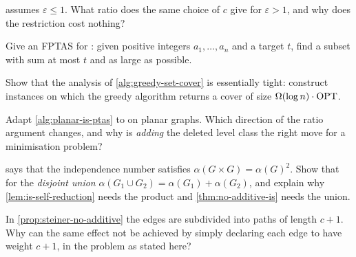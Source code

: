 \begin{exercise}
 assumes $\varepsilon \le 1$. What ratio does the same
choice of $c$ give for $\varepsilon > 1$, and why does the restriction cost
nothing?
\end{exercise}

\begin{exercise}
Give an FPTAS for : given positive integers $a_1,\dots,a_n$ and
a target $t$, find a subset with sum at most $t$ and as large as possible.
\end{exercise}

\begin{exercise}
Show that the analysis of \cref{alg:greedy-set-cover} is essentially tight:
construct instances on which the greedy algorithm returns a cover of size
$\Omega(\log n) \cdot \mathrm{OPT}$.
\end{exercise}

\begin{exercise}
Adapt \cref{alg:planar-is-ptas} to  on planar graphs. Which
direction of the ratio argument changes, and why is \emph{adding} the deleted
level class the right move for a minimisation problem?
\end{exercise}

\begin{exercise}
 says that the independence number satisfies
$\alpha(G \times G) = \alpha(G)^2$. Show that for the \emph{disjoint union}
$\alpha(G_1 \cup G_2) = \alpha(G_1) + \alpha(G_2)$, and explain why
\cref{lem:is-self-reduction} needs the product and \cref{thm:no-additive-is}
needs the union.
\end{exercise}

\begin{exercise}
In \cref{prop:steiner-no-additive} the edges are subdivided into paths of length
$c+1$. Why can the same effect not be achieved by simply declaring each edge to
have weight $c+1$, in the problem as stated here?
\end{exercise}

